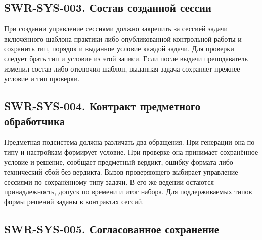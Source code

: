 \documentclass[12pt,a4paper]{article}
\begin{document}
\subsection{SWR-SYS-003. Состав созданной сессии}\label{swr-sys-003-ux441ux43eux441ux442ux430ux432-ux441ux43eux437ux434ux430ux43dux43dux43eux439-ux441ux435ux441ux441ux438ux438}

\hypertarget{swr-sys-003-состав-созданной-сессии}{}

\hypertarget{swr-sys-003}{}

При создании управление сессиями должно закрепить за сессией задачи включённого шаблона практики либо опубликованной контрольной работы и сохранить тип, порядок и выданное условие каждой задачи. Для проверки следует брать тип и условие из этой записи. Если после выдачи преподаватель изменил состав либо отключил шаблон, выданная задача сохраняет прежнее условие и тип проверки.

\subsection{SWR-SYS-004. Контракт предметного обработчика}\label{swr-sys-004-ux43aux43eux43dux442ux440ux430ux43aux442-ux43fux440ux435ux434ux43cux435ux442ux43dux43eux433ux43e-ux43eux431ux440ux430ux431ux43eux442ux447ux438ux43aux430}

\hypertarget{swr-sys-004-контракт-предметного-обработчика}{}

\hypertarget{swr-sys-004}{}

Предметная подсистема должна различать два обращения. При генерации она по типу и настройкам формирует условие. При проверке она принимает сохранённое условие и решение, сообщает предметный вердикт, ошибку формата либо технический сбой без вердикта. Вызов проверяющего выбирает управление сессиями по сохранённому типу задачи. В его же ведении остаются принадлежность, допуск по времени и итог набора. Для поддерживаемых типов формы решений заданы в {\href{DOC-06.2\_Сессии\_задач\_и\_планировщик.pdf\#предметный-ответ}{контрактах сессий}}.

\subsection{SWR-SYS-005. Согласованное сохранение}\label{swr-sys-005-ux441ux43eux433ux43bux430ux441ux43eux432ux430ux43dux43dux43eux435-ux441ux43eux445ux440ux430ux43dux435ux43dux438ux435}

\hypertarget{swr-sys-005-согласованное-сохранение}{}
\end{document}
